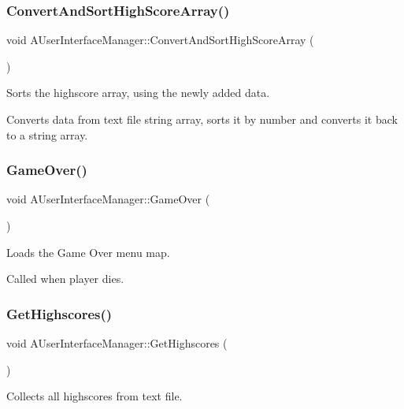 \subsubsection{\texorpdfstring{ConvertAndSortHighScoreArray()}{ConvertAndSortHighScoreArray()}}
{\footnotesize\ttfamily void A\+User\+Interface\+Manager\+::\+Convert\+And\+Sort\+High\+Score\+Array (\begin{DoxyParamCaption}{ }\end{DoxyParamCaption})}



Sorts the highscore array, using the newly added data. 

Converts data from text file string array, sorts it by number and converts it back to a string array. \mbox{\label{class_a_user_interface_manager_aa77f6ee265e9eb803e587e124242e545}} 
\subsubsection{\texorpdfstring{GameOver()}{GameOver()}}
{\footnotesize\ttfamily void A\+User\+Interface\+Manager\+::\+Game\+Over (\begin{DoxyParamCaption}{ }\end{DoxyParamCaption})}



Loads the Game Over menu map. 

Called when player dies. \mbox{\label{class_a_user_interface_manager_a60cd439b46ed433c1d37b9eb5da7a419}} 
\subsubsection{\texorpdfstring{GetHighscores()}{GetHighscores()}}
{\footnotesize\ttfamily void A\+User\+Interface\+Manager\+::\+Get\+Highscores (\begin{DoxyParamCaption}{ }\end{DoxyParamCaption})}



Collects all highscores from text file. 

